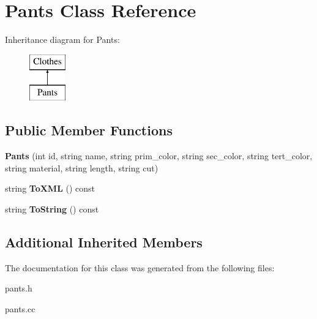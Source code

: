 \hypertarget{classPants}{}\section{Pants Class Reference}
\label{classPants}
Inheritance diagram for Pants\+:\begin{figure}[H]
\begin{center}
\leavevmode
\includegraphics[height=2.000000cm]{classPants}
\end{center}
\end{figure}
\subsection*{Public Member Functions}
\begin{DoxyCompactItemize}
\item 
\mbox{\label{classPants_a9ca6f6ddce0ac46556b6e56a9d73ddd0}} 
{\bfseries Pants} (int id, string name, string prim\+\_\+color, string sec\+\_\+color, string tert\+\_\+color, string material, string length, string cut)
\item 
\mbox{\label{classPants_aa62270b70cbb40b7b420f1091ad7e43b}} 
string {\bfseries To\+X\+ML} () const
\item 
\mbox{\label{classPants_a9b5fcde766a77877bf428e18c65f1e70}} 
string {\bfseries To\+String} () const
\end{DoxyCompactItemize}
\subsection*{Additional Inherited Members}


The documentation for this class was generated from the following files\+:\begin{DoxyCompactItemize}
\item 
pants.\+h\item 
pants.\+cc\end{DoxyCompactItemize}
